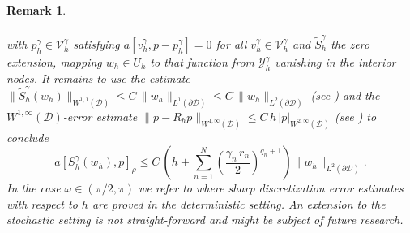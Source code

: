 \documentclass[a4paper,10pt]{article}
\newcommand{\cD}{{\mathcal{D}}}
\newtheorem{remark}[theorem]{Remark}
\numberwithin{theorem}{section}
\begin{document}
\begin{remark}
\begin{enumerate}[label=\alph*)]
\begin{align*}
    \end{align*}
    with $p_h^\gamma\in \mathcal V_h^\gamma$ satisfying $a[v_h^\gamma,p-p_h^\gamma]=0$ for all $v_h^\gamma\in \mathcal V_h^\gamma$ and $\widetilde S_h^\gamma$ the zero extension, mapping $w_h\in U_h$ to that function from $\mathcal Y_h^\gamma$ vanishing in the interior nodes. It remains to use the estimate $\|\widetilde S_h^\gamma(w_h)\|_{W^{1,1}(\cD)}\le C\,\|w_h\|_{L^1(\partial\cD)} \le C\,\|w_h\|_{L^2(\partial\cD)}$ (see \cite[Lemma 3.3]{SMay_RRannacher_BVexler_2013}) and the $W^{1,\infty}(\cD)$-error estimate $\|p-R_hp\|_{W^{1,\infty}(\cD)} \le C\,h\,|p|_{W^{2,\infty}(\cD)}$ (see \cite{RRannacher_RScott_1982}) to conclude
    \begin{equation*}
      a[S_h^\gamma (w_h), p]_\rho
      \le C\,\left(h +  \sum \limits_{n=1}^N \left(\frac{\gamma_n\,r_n}{2}\right)^{q_n+1}\right)\|w_h\|_{L^2(\partial\cD)}.
    \end{equation*}
    In the case $\omega \in (\pi/2,\pi)$ we refer to \cite{TApel_MMateos_JPfefferer_ARosch_2018,JPfefferer_MWinkler_2019} where sharp discretization error estimates with respect to $h$ are proved in the deterministic setting. An extension to the stochastic setting is not straight-forward and might be subject of future research.
  \end{enumerate}
\end{remark}
\end{document}
